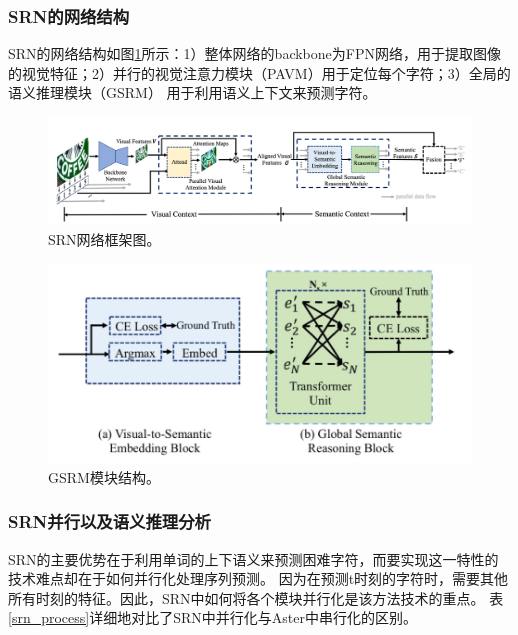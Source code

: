 \subsubsection{SRN的网络结构}
SRN的网络结构如图\ref{srn_framework}所示：1）整体网络的backbone为FPN网络，用于提取图像的视觉特征；2）并行的视觉注意力模块（PAVM）用于定位每个字符；3）全局的语义推理模块（GSRM）
用于利用语义上下文来预测字符。
\begin{figure}[H]
    \centering
    \includegraphics[width=.98\textwidth]{figure/recognition/srn_framework.png} 
    \caption{SRN网络框架图。} 
    \label{srn_framework} 
\end{figure}

\begin{figure}[H]
    \centering
    \includegraphics[width=.7\textwidth]{figure/recognition/srn_gsrm.png} 
    \caption{GSRM模块结构。} 
    \label{srn_gsrm} 
\end{figure}
\subsubsection{SRN并行以及语义推理分析}
SRN的主要优势在于利用单词的上下语义来预测困难字符，而要实现这一特性的技术难点却在于如何并行化处理序列预测。
因为在预测t时刻的字符时，需要其他所有时刻的特征。因此，SRN中如何将各个模块并行化是该方法技术的重点。
表\ref{srn_process}详细地对比了SRN中并行化与Aster中串行化的区别。

